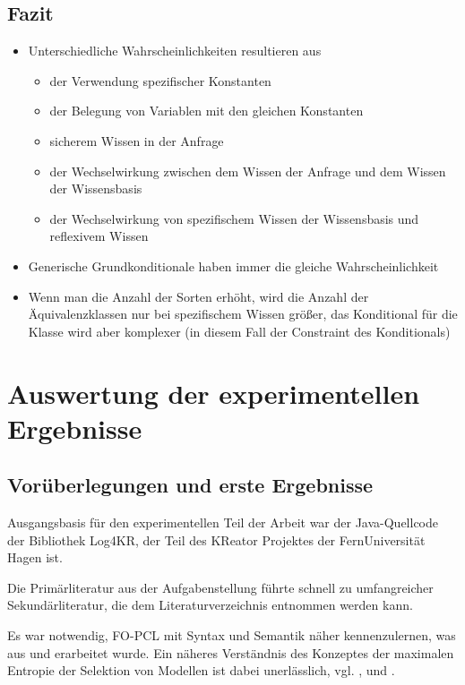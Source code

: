 \documentclass[a4paper, 11pt]{book}
\begin{document}
	\section{Fazit}
		\begin{itemize}
	\item Unterschiedliche Wahrscheinlichkeiten resultieren aus
	\begin{itemize}
		\item der Verwendung spezifischer Konstanten 
		\item der Belegung von Variablen mit den gleichen Konstanten
		\item sicherem Wissen in der Anfrage
		\item der Wechselwirkung zwischen dem Wissen der Anfrage und dem Wissen der Wissensbasis
		\item der Wechselwirkung von spezifischem Wissen der Wissensbasis und reflexivem Wissen
		\end{itemize}
	\item Generische Grundkonditionale haben immer die gleiche Wahrscheinlichkeit
	\item Wenn man die Anzahl der Sorten erhöht, wird die Anzahl der Äquivalenzklassen nur bei spezifischem Wissen größer, das Konditional für die Klasse wird aber komplexer (in diesem Fall der Constraint des Konditionals)
\end{itemize}


 

\chapter{Auswertung der experimentellen Ergebnisse}\label{Beob}

\section{Vorüberlegungen und erste Ergebnisse}
Ausgangsbasis für den experimentellen Teil der Arbeit war der Java-Quellcode der Bibliothek Log4KR, der Teil des KReator Projektes der FernUniversität Hagen ist.

Die Primärliteratur aus der Aufgabenstellung \cite{Fis10} führte schnell zu umfangreicher Sekundärliteratur, die dem Literaturverzeichnis entnommen werden kann.

Es war notwendig, FO-PCL mit Syntax und Semantik näher kennenzulernen, was aus \cite{Fis10} und \cite{Fis12} erarbeitet wurde. Ein näheres Verständnis des Konzeptes der maximalen Entropie der Selektion von Modellen ist dabei unerlässlich, vgl. \cite{RKI97}, \cite{BKI08} und \cite{TFLKIB10}.
\end{document}
